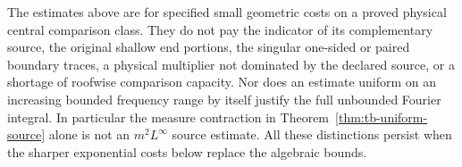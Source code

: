 \begin{remark}\label{rem:nc-scope}
The estimates above are for specified small geometric costs on a
proved physical central comparison class.  They do not pay the
indicator of its complementary source, the original shallow end
portions, the singular one-sided or paired boundary traces, a
physical multiplier not dominated by the declared source, or a
shortage of roofwise comparison capacity.  Nor does an estimate
uniform on an increasing bounded frequency range by itself justify
the full unbounded Fourier integral.  In particular the measure
contraction in Theorem~\ref{thm:tb-uniform-source} alone is not an
$m^2L^\infty$ source estimate.  All these distinctions persist when
the sharper exponential costs below replace the algebraic bounds.
\end{remark}
